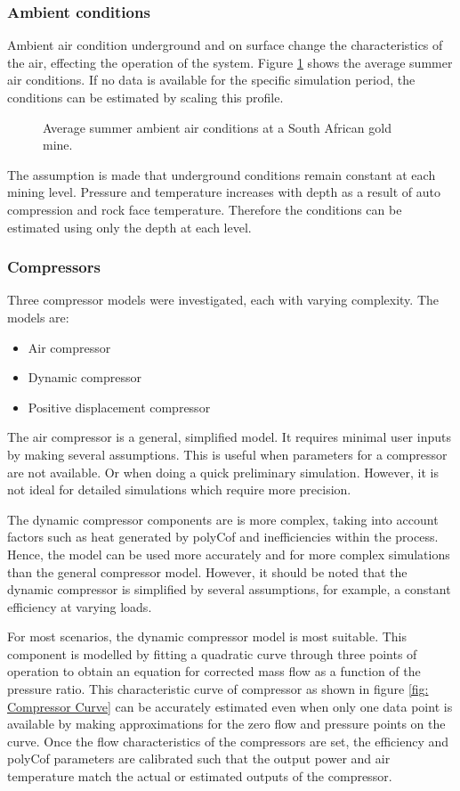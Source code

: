 		\subsubsection{Ambient conditions}
		Ambient air condition underground and on surface change the characteristics of the air, effecting the operation of the system. Figure \ref{fig: Ambient} shows the average summer air conditions. If no data is available for the specific simulation period, the conditions can be estimated by scaling this profile. 
		\begin{figure}[h]
			\centering
			\fbox{}
			\caption{Average summer ambient air conditions at a South African gold mine.}
			\label{fig: Ambient}
		\end{figure}
		The assumption is made that underground conditions remain constant at each mining level. Pressure and temperature increases with depth as a result of auto compression and rock face temperature. Therefore the conditions can be estimated using only the depth at each level.   
		\subsubsection{Compressors}
		Three compressor models were investigated, each with varying complexity. The models are:
		\begin{itemize}
			\item Air compressor
			\item Dynamic compressor 
			\item Positive displacement compressor
		\end{itemize}  
		The air compressor is a general, simplified model. It requires minimal user inputs by making several assumptions. This is useful when parameters for a compressor are not available. Or when doing a quick preliminary simulation. However, it is not ideal for detailed simulations which require more precision. 
		\par 
		The dynamic compressor components are is more complex, taking into account factors such as heat generated by \gls{polyCof} and inefficiencies within the process. Hence, the model can be used more accurately and for more complex simulations than the general compressor model. However, it should be noted that the dynamic compressor is simplified by several assumptions, for example, a constant efficiency at varying loads. 
		\par 	 
		For most scenarios, the dynamic compressor model is most suitable. This component is modelled by fitting a quadratic curve through three points of operation to obtain an equation for corrected mass flow as a function of the pressure ratio. This characteristic curve of compressor  as shown in figure \ref{fig: Compressor Curve} can be accurately estimated even when only one data point is available by making approximations for the zero flow and pressure points on the curve. Once the flow characteristics of the compressors are set, the efficiency and \gls{polyCof} parameters are calibrated such that the output power and air temperature match the actual or estimated outputs of the compressor.
		
